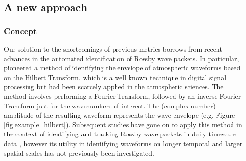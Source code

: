 \subsection{A new approach}

\subsubsection{Concept}

Our solution to the shortcomings of previous metrics borrows from recent advances in the automated identification of Rossby wave packets. In particular, \citet{Zimin2003} pioneered a method of identifying the envelope of atmospheric waveforms based on the Hilbert Transform, which is a well known technique in digital signal processing but had been scarcely applied in the atmospheric sciences. The method involves performing a Fourier Transform, followed by an inverse Fourier Transform just for the wavenumbers of interest. The (complex number) amplitude of the resulting waveform represents the wave envelope (e.g. Figure \ref{fig:example_hilbert}). Subsequent studies have gone on to apply this method in the context of identifying and tracking Rossby wave packets in daily timescale data \citep{Glatt2014,Souders2014a}, however its utility in identifying waveforms on longer temporal and larger spatial scales has not previously been investigated.